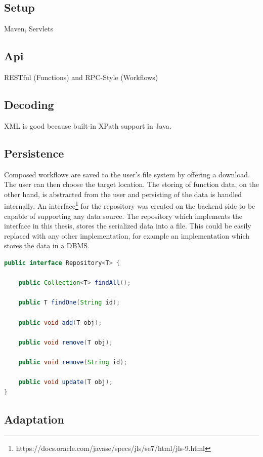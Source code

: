 \documentclass[a4paper,12pt,pdftex,halfparskip,cleardoubleempty,bibtotoc,liststotoc]{scrbook}
\begin{document}
\subsection{Setup}
 Maven, Servlets

\subsection{Api}

RESTful (Functions) and RPC-Style (Workflows)

\subsection{Decoding}
\label{sec:backend-decoding}
 XML is good because built-in XPath support in Java.

\subsection{Persistence}
\label{sec:backend-persistence}

Composed workflows are saved to the user's file system by offering a download. The user can then choose the target location.
The storing of function data, on the other hand, is abstracted from the user and persisting of the data is handled internally.
An interface\footnote{https://docs.oracle.com/javase/specs/jls/se7/html/jls-9.html} for the repository was created on the backend side to be capable of supporting any data source. The repository which implements the interface in this thesis, stores the serialized data into a file. This could be easily replaced with any other implementation, for example an implementation which stores the data in a DBMS.

\begin{lstlisting}[language=Java, caption=Repository Interface]
public interface Repository<T> {

    public Collection<T> findAll();

    public T findOne(String id);

    public void add(T obj);

    public void remove(T obj);

    public void remove(String id);

    public void update(T obj);
}
\end{lstlisting}

\subsection{Adaptation}
\end{document}
